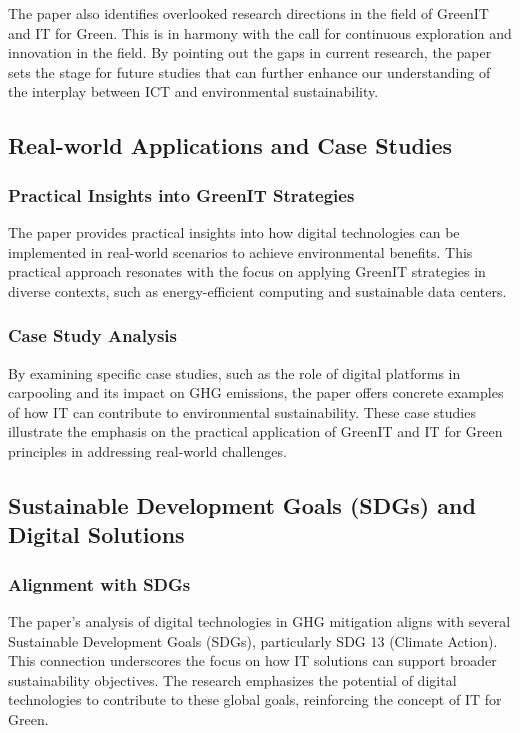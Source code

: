 \documentclass[conference,compsoc]{IEEEtran}
\begin{document}
The paper also identifies overlooked research directions in the field of GreenIT and IT for Green. This is in harmony with the  call for continuous exploration and innovation in the field. By pointing out the gaps in current research, the paper sets the stage for future studies that can further enhance our understanding of the interplay between ICT and environmental sustainability.

\subsection{Real-world Applications and Case Studies}

\subsubsection{Practical Insights into GreenIT Strategies}

The paper provides practical insights into how digital technologies can be implemented in real-world scenarios to achieve environmental benefits. This practical approach resonates with the  focus on applying GreenIT strategies in diverse contexts, such as energy-efficient computing and sustainable data centers.

\subsubsection{Case Study Analysis}

By examining specific case studies, such as the role of digital platforms in carpooling and its impact on GHG emissions, the paper offers concrete examples of how IT can contribute to environmental sustainability. These case studies illustrate the  emphasis on the practical application of GreenIT and IT for Green principles in addressing real-world challenges.

\subsection{Sustainable Development Goals (SDGs) and Digital Solutions}

\subsubsection{Alignment with SDGs}

The paper's analysis of digital technologies in GHG mitigation aligns with several Sustainable Development Goals (SDGs), particularly SDG 13 (Climate Action). This connection underscores the  focus on how IT solutions can support broader sustainability objectives. The research emphasizes the potential of digital technologies to contribute to these global goals, reinforcing the concept of IT for Green.
\end{document}
